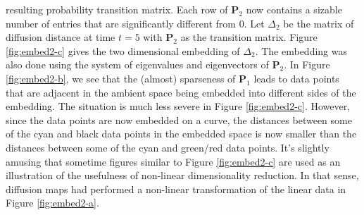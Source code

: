 resulting probability transition matrix. Each row of $\mathbf{P}_2$
now contains a sizable number of entries that are significantly
different from $0$. Let $\Delta_{2}$ be the matrix of diffusion
distance at time $t = 5$ with $\mathbf{P}_2$ as the transition
matrix. Figure \ref{fig:embed2-c} gives the two dimensional embedding
of $\Delta_{2}$. The embedding was also done using the system of
eigenvalues and eigenvectors of $\mathbf{P}_2$. In Figure
\ref{fig:embed2-b}, we see that the (almost) sparseness of
$\mathbf{P}_1$ leads to data points that are adjacent in the ambient
space being embedded into different sides of the embedding. The
situation is much less severe in Figure \ref{fig:embed2-c}. However,
since the data points are now embedded on a curve, the distances
between some of the cyan and black data points in the embedded space
is now smaller than the distances between some of the cyan and green/red
data points. It's slightly amusing that sometime figures similar to
Figure \ref{fig:embed2-c} are used as an illustration of the
usefulness of non-linear dimensionality reduction. In that sense,
diffusion maps had performed a non-linear transformation
of the linear data in Figure \ref{fig:embed2-a}.
